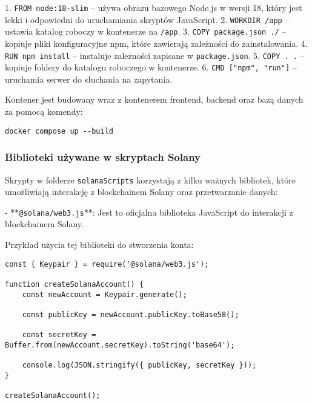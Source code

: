 1. \texttt{FROM node:18-slim} – używa obrazu bazowego Node.js w wersji 18, który jest lekki i odpowiedni do uruchamiania skryptów JavaScript.
2. \texttt{WORKDIR /app} – ustawia katalog roboczy w kontenerze na \texttt{/app}.
3. \texttt{COPY package.json ./} – kopiuje pliki konfiguracyjne npm, które zawierają zależności do zainstalowania.
4. \texttt{RUN npm install} – instaluje zależności zapisane w \texttt{package.json}.
5. \texttt{COPY . .} – kopiuje foldery do katalogu roboczego w kontenerze.
6. \texttt{CMD ["npm", "run"]} – uruchamia serwer do słuchania na zapytania.

Kontener jest budowany wraz z kontenerem frontend, backend oraz bazą danych za pomocą komendy:

\begin{verbatim}
docker compose up --build
\end{verbatim}

\subsubsection{Biblioteki używane w skryptach Solany}

Skrypty w folderze \texttt{solanaScripts} korzystają z kilku ważnych bibliotek, które umożliwiają interakcję z blockchainem Solany oraz przetwarzanie danych:

- **\texttt{@solana/web3.js}**: Jest to oficjalna biblioteka JavaScript do interakcji z blockchainem Solany. 
  
  Przykład użycia tej biblioteki do stworzenia konta:
  \begin{verbatim}
const { Keypair } = require('@solana/web3.js');

function createSolanaAccount() {
    const newAccount = Keypair.generate();

    const publicKey = newAccount.publicKey.toBase58();

    const secretKey = Buffer.from(newAccount.secretKey).toString('base64');

    console.log(JSON.stringify({ publicKey, secretKey }));
}

createSolanaAccount();
  \end{verbatim}